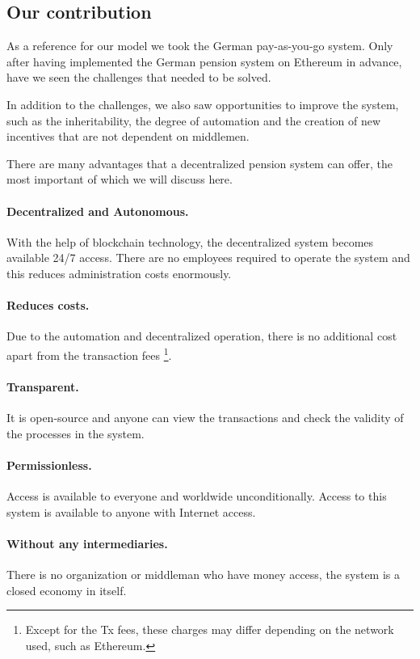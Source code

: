 \subsection{Our contribution}
As a reference for our model we took the German pay-as-you-go system. Only after having implemented the German pension system on Ethereum in advance, have we seen the challenges that needed to be solved.

In addition to the challenges, we also saw opportunities to improve the system, such as the inheritability, the degree of automation and the creation of new incentives that are not dependent on middlemen.

There are many advantages that a decentralized pension system can offer, the most important of which we will discuss here.

\paragraph{Decentralized and Autonomous.} With the help of blockchain technology, the decentralized system becomes available 24/7 access. There are no employees required to operate the system and this reduces administration costs enormously.

\paragraph{Reduces costs.} Due to the automation and decentralized operation, there is no additional cost apart from the transaction fees \footnote{Except for the Tx fees, these charges may differ depending on the network used, such as Ethereum.}.

\paragraph{Transparent.} It is open-source and anyone can view the transactions and check the validity of the processes in the system.

\paragraph{Permissionless.} 
Access is available to everyone and worldwide unconditionally. Access to this system is available to anyone with Internet access.

\paragraph{Without any intermediaries.} 
There is no organization or middleman who have money access, the system is a closed economy in itself.


